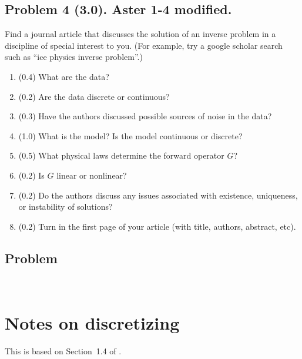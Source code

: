 \documentclass[11pt,titlepage,fleqn]{article}
\begin{document}

\subsection*{Problem 4 (3.0). Aster 1-4 modified.}

Find a journal article that discusses the solution of an inverse problem in a discipline of special interest to you. (For example, try a google scholar search such as ``ice physics inverse problem''.)
%
\begin{enumerate}
\item (0.4) What are the data?
\item (0.2) Are the data discrete or continuous?
\item (0.3) Have the authors discussed possible sources of noise in the data?
\item (1.0) What is the model? Is the model continuous or discrete?
\item (0.5) What physical laws determine the forward operator $G$?
\item (0.2) Is $G$ linear or nonlinear?
\item (0.2) Do the authors discuss any issues associated with existence, uniqueness, or instability of solutions?
\item (0.2) Turn in the first page of your article (with title, authors, abstract, etc).
\end{enumerate}


\subsection*{Problem} \howmuchtime\

\nocite{Aster}




\appendix

\pagebreak

\section{Notes on discretizing}

This is based on Section~1.4 of \citet{Aster}.
\end{document}

